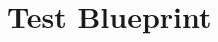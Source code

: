 \documentclass[runningheads]{llncs}
\newcommand{\fig}[4]{
	\begin{figure}[#1]
		\centering
		\texttt{[image: \#3]}
		\caption{\label{fig:#3}#4}
	\end{figure}}
\newcommand{\seclabel}[1]{\label{sec:#1}}
\newcommand{\figref}[1]{Figure~\ref{fig:#1}}
\newcommand{\tablabel}[1]{\label{tab:#1}}
\begin{document}
%
%





\section{Test Blueprint} \seclabel{testblueprint}
\end{document}
